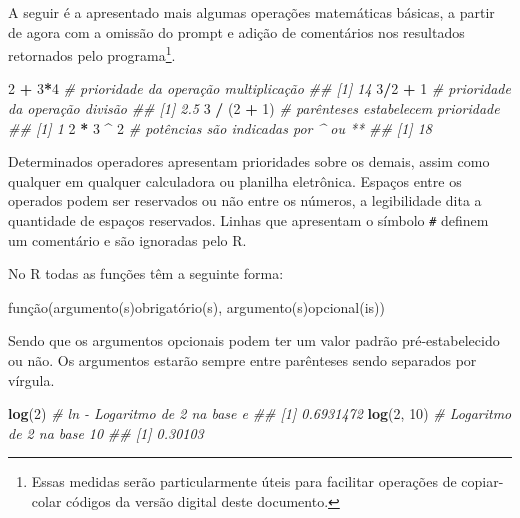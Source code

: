 \documentclass[
  11pt,
  a5paper,
  openany]{book}
\newenvironment{Shaded}{\begin{snugshade}}{\end{snugshade}}
\newcommand{\CommentTok}[1]{\textcolor[rgb]{0.56,0.35,0.01}{\textit{#1}}}
\newcommand{\DecValTok}[1]{\textcolor[rgb]{0.00,0.00,0.81}{#1}}
\newcommand{\KeywordTok}[1]{\textcolor[rgb]{0.13,0.29,0.53}{\textbf{#1}}}
\newcommand{\NormalTok}[1]{#1}
\newcommand{\OperatorTok}[1]{\textcolor[rgb]{0.81,0.36,0.00}{\textbf{#1}}}
\newcommand{\StringTok}[1]{\textcolor[rgb]{0.31,0.60,0.02}{#1}}
\begin{document}
A seguir é a apresentado mais algumas operações matemáticas básicas, a partir de agora com a omissão do prompt e adição de comentários nos resultados retornados pelo programa\footnote{Essas medidas serão particularmente úteis para facilitar operações de copiar-colar códigos da versão digital deste documento.}.

\begin{Shaded}
\begin{Highlighting}[]
\DecValTok{2} \OperatorTok{+}\StringTok{ }\DecValTok{3}\OperatorTok{*}\DecValTok{4} \CommentTok{# prioridade da operação multiplicação}
\CommentTok{## [1] 14}
\DecValTok{3}\OperatorTok{/}\DecValTok{2} \OperatorTok{+}\StringTok{ }\DecValTok{1} \CommentTok{# prioridade da operação divisão}
\CommentTok{## [1] 2.5}
\DecValTok{3} \OperatorTok{/}\StringTok{ }\NormalTok{(}\DecValTok{2} \OperatorTok{+}\StringTok{ }\DecValTok{1}\NormalTok{) }\CommentTok{# parênteses estabelecem prioridade}
\CommentTok{## [1] 1}
\DecValTok{2} \OperatorTok{*}\StringTok{ }\DecValTok{3} \OperatorTok{^}\StringTok{ }\DecValTok{2} \CommentTok{# potências são indicadas por ^ ou **  }
\CommentTok{## [1] 18}
\end{Highlighting}
\end{Shaded}

Determinados operadores apresentam prioridades sobre os demais, assim como qualquer em qualquer calculadora ou planilha eletrônica. Espaços entre os operados podem ser reservados ou não entre os números, a legibilidade dita a quantidade de espaços reservados. Linhas que apresentam o símbolo \texttt{\#} definem um comentário e são ignoradas pelo R.

No R todas as funções têm a seguinte forma:

função(argumento(s)obrigatório(s), argumento(s)opcional(is))

Sendo que os argumentos opcionais podem ter um valor padrão pré-estabelecido ou não. Os argumentos estarão sempre entre parênteses sendo separados por vírgula.

\begin{Shaded}
\begin{Highlighting}[]
\KeywordTok{log}\NormalTok{(}\DecValTok{2}\NormalTok{) }\CommentTok{# ln - Logaritmo de 2 na base e}
\CommentTok{## [1] 0.6931472}
\KeywordTok{log}\NormalTok{(}\DecValTok{2}\NormalTok{, }\DecValTok{10}\NormalTok{) }\CommentTok{# Logaritmo de 2 na base 10}
\CommentTok{## [1] 0.30103}
\end{Highlighting}
\end{Shaded}
\end{document}
